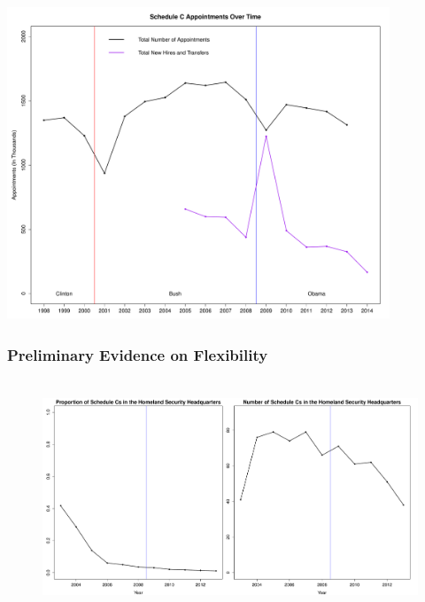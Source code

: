 \documentclass{beamer}
\begin{document}
\begin{frame}
\begin{center}
\includegraphics[height=3.7in,width=4.5in]{SCAptsandAccOverTime.pdf}
\end{center}
\end{frame}

\begin{frame}
\frametitle{Preliminary Evidence on Flexibility}
\begin{figure}[htb]
\begin{center}
\includegraphics[height=2.75in,width=4.9in]{DHSProportionRawNumber.pdf}
\end{center}
\end{figure}
\end{frame}
\end{document}
